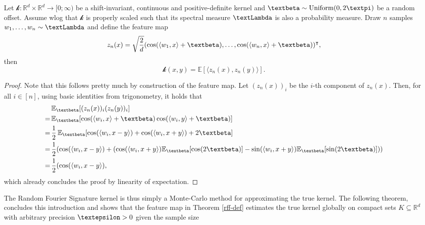 \documentclass[openany]{book}
\begin{document}
\begin{theorem}\label{rff-def}
    Let $\mathscr k:\mathbb R^d\times \mathbb R^d\to [0;\infty)$ be a shift-invariant, continuous and positive-definite kernel and $\gbeta\sim\textrm{Uniform(0,\,2\gpi)}$ be a random offset. Assume wlog that $\mathscr k$ is properly scaled such that its spectral measure $\gLambda$ is also a probability measure. Draw $n$ samples $w_1,\dots,w_n\sim \gLambda$ and define the feature map
    \begin{equation*}
        z_n(x)=\sqrt{\frac{2}{d}}(\cos (\langle w_1,x\rangle +\gbeta),\dots,\cos (\langle w_n,x\rangle +\gbeta))^\intercal,
    \end{equation*} 
    then 
    \begin{equation*}
        \mathscr k(x,y)=\mathbb E[\langle z_n(x), z_n(y)\rangle ].
    \end{equation*}
    \begin{proof}
        Note that this follows pretty much by construction of the feature map. Let $(z_n(x))_i$ be the $i$-th component of $z_n(x)$. Then, for all $i\in [n]$, using basic identities from trigonometry, it holds that
        \begin{equation*}
        \begin{split}
            &\,\mathbb E_{\gbeta}[(z_n(x))_i(z_n(y))_i]\\=&\,\mathbb E_{\gbeta}[\cos(\langle w_i,x\rangle +\gbeta)\cos(\langle w_i,y\rangle +\gbeta)]\\=&\,\frac{1}{2}\,\mathbb E_{\gbeta}[\cos(\langle w_i,x-y\rangle)+\cos(\langle w_i, x+y\rangle)+ 2\gbeta] \\=&\,\frac{1}{2}(\cos(\langle w_i,x-y\rangle)+(\cos(\langle w_i,x+y\rangle)\mathbb E_{\gbeta}[\cos(2\gbeta)]-\sin(\langle w_i,x+y\rangle)\mathbb E_{\gbeta}[\sin(2\gbeta)]))\\=&\,\frac{1}{2}(\cos(\langle w_i,x-y\rangle),
        \end{split}
        \end{equation*}
        which already concludes the proof by linearity of expectation.
    \end{proof}
\end{theorem}
The Random Fourier Signature kernel is thus simply a Monte-Carlo method for approximating the true kernel. The following theorem, concludes this introduction and shows that the feature map in Theorem \ref{rff-def} estimates the true kernel globally on compact sets $K\subseteq \mathbb R^d$ with arbitrary precision $\gepsilon>0$ \cite{rahimi2007} given the sample size
\end{document}
